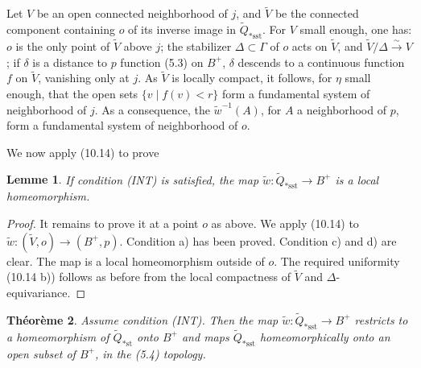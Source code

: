 \documentclass[12pt,a4paper]{article}
\theoremstyle{plain}
\newtheorem{theorem}{Th\'eor\`eme}[section]
\newtheorem{lemma}[theorem]{Lemme}
\theoremstyle{definition}
\theoremstyle{remark}
\begin{document}
Let $V$ be an open connected neighborhood of $j$, and $\widetilde{V}$ be the connected component containing $o$ of its inverse image in $\widetilde{Q}_{*\text{sst}}$. For $V$ small enough, one has: $o$ is the only point of $\widetilde{V}$ above $j$; the stabilizer $\Delta \subset \Gamma$ of $o$ acts on $\widetilde{V}$, and $\widetilde{V}/\Delta \xrightarrow{\sim} V$; if $\delta$ is a distance to $p$ function (5.3) on $B^+$, $\delta$ descends to a continuous function $f$ on $\widetilde{V}$, vanishing only at $j$. As $\widetilde{V}$ is locally compact, it follows, for $\eta$ small enough, that the open sets $\{v \mid f(v) < r\}$ form a fundamental system of neighborhood of $j$. As a consequence, the $\widetilde{w}^{-1}(A)$, for $A$ a neighborhood of $p$, form a fundamental system of neighborhood of $o$.

We now apply (10.14) to prove

\begin{lemma}
\label{10.18.1}
If condition (INT) is satisfied, the map $\widetilde{w} : \widetilde{Q}_{*\text{sst}} \to B^+$ is a local homeomorphism.
\end{lemma}

\begin{proof}
It remains to prove it at a point $o$ as above. We apply (10.14) to $\widetilde{w} : (\widetilde{V}, o) \to (B^+, p)$. Condition a) has been proved. Condition c) and d) are clear. The map is a local homeomorphism outside of $o$. The required uniformity (10.14 b)) follows as before from the local compactness of $\widetilde{V}$ and $\Delta$-equivariance.
\end{proof}

\begin{theorem}
\label{10.18.2}
Assume condition (INT). Then the map $\widetilde{w} : \widetilde{Q}_{*\text{sst}} \to B^+$ restricts to a homeomorphism of $\widetilde{Q}_{*\text{st}}$ onto $B^+$ and maps $\widetilde{Q}_{*\text{sst}}$ homeomorphically onto an open subset of $B^+$, in the (5.4) topology.
\end{theorem}
\end{document}
